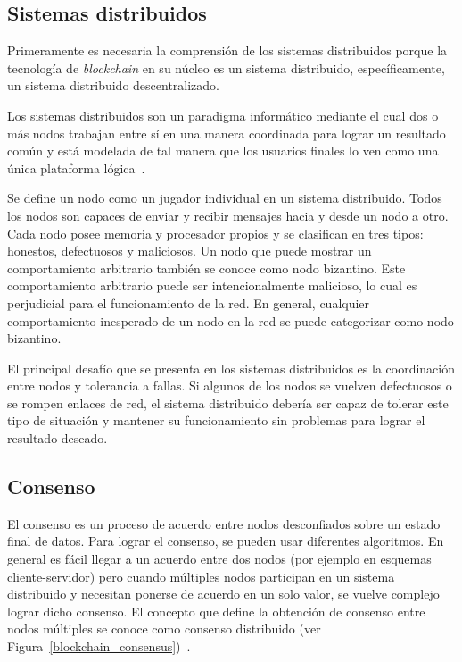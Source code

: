 \subsection {Sistemas distribuidos}

Primeramente es necesaria la  comprensión de los sistemas distribuidos porque  la tecnología de \textit{blockchain} en su núcleo es un sistema distribuido, específicamente, un sistema distribuido descentralizado.

Los sistemas distribuidos son un paradigma informático mediante el cual dos o más nodos trabajan entre sí en una manera coordinada para lograr un resultado común y está modelada de tal manera que los usuarios finales lo ven como una única plataforma lógica~\cite{bashir2017mastering}.

Se define un nodo como un jugador individual en un sistema distribuido. Todos los nodos son capaces de enviar y recibir mensajes hacia y desde un nodo a otro. Cada nodo posee memoria y procesador propios y se clasifican en tres tipos:  honestos, defectuosos y maliciosos.
Un nodo que puede mostrar un comportamiento arbitrario también se conoce como nodo bizantino. Este comportamiento arbitrario puede ser intencionalmente malicioso, lo cual es perjudicial para el funcionamiento de la red. En general, cualquier comportamiento inesperado de un nodo en la red se puede categorizar como nodo bizantino.

El principal desafío que se presenta en los sistemas distribuidos es la coordinación entre nodos y tolerancia a fallas. Si algunos de los nodos se vuelven defectuosos o se rompen enlaces de red, el sistema distribuido debería ser capaz de  tolerar este tipo de situación y mantener su funcionamiento sin problemas para lograr el resultado deseado.


\subsection{Consenso}
El consenso es un proceso de acuerdo entre nodos desconfiados sobre un estado final de datos. Para lograr el consenso, se pueden usar diferentes algoritmos. En general es fácil llegar a un acuerdo entre dos nodos (por ejemplo en esquemas cliente-servidor) pero cuando múltiples nodos participan en un sistema distribuido y necesitan ponerse de acuerdo en un solo valor, se vuelve complejo lograr dicho consenso. El concepto que define la obtención de consenso entre nodos múltiples se conoce como consenso distribuido (ver Figura~\ref{blockchain_consensus})~\cite{bashir2017mastering}. 

